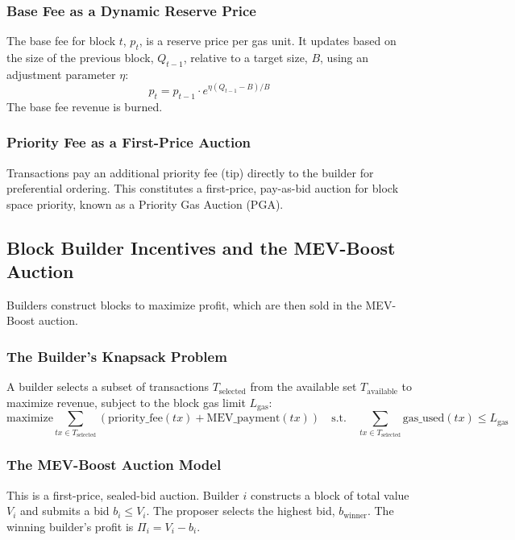\subsubsection{Base Fee as a Dynamic Reserve Price}
The base fee for block $t$, $p_t$, is a reserve price per gas unit. It updates based on the size of the previous block, $Q_{t-1}$, relative to a target size, $B$, using an adjustment parameter $\eta$:
$$p_{t} = p_{t-1} \cdot e^{\eta(Q_{t-1} - B)/B}$$
The base fee revenue is burned.

\subsubsection{Priority Fee as a First-Price Auction}
Transactions pay an additional priority fee (tip) directly to the builder for preferential ordering. This constitutes a first-price, pay-as-bid auction for block space priority, known as a Priority Gas Auction (PGA).

\subsection{Block Builder Incentives and the MEV-Boost Auction}
Builders construct blocks to maximize profit, which are then sold in the MEV-Boost auction.

\subsubsection{The Builder's Knapsack Problem}
A builder selects a subset of transactions $T_{\text{selected}}$ from the available set $T_{\text{available}}$ to maximize revenue, subject to the block gas limit $L_{\text{gas}}$:
$$ \text{maximize} \sum_{tx \in T_{\text{selected}}} (\text{priority\_fee}(tx) + \text{MEV\_payment}(tx)) \quad \text{s.t.} \quad \sum_{tx \in T_{\text{selected}}} \text{gas\_used}(tx) \le L_{\text{gas}} $$

\subsubsection{The MEV-Boost Auction Model}
This is a first-price, sealed-bid auction. Builder $i$ constructs a block of total value $V_i$ and submits a bid $b_i \le V_i$. The proposer selects the highest bid, $b_{\text{winner}}$. The winning builder's profit is $\Pi_i = V_i - b_i$.